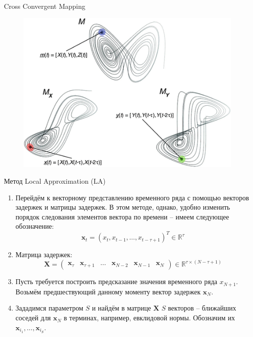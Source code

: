 \begin{frame}{Cross Convergent Mapping}
\begin{figure}
    \centering
    \includegraphics[width=\textwidth]{lecture_5/figs/CCM.png}
\end{figure}
\end{frame}
\begin{frame}{Метод Local Approximation (LA)}

\begin{enumerate}
    \item Перейдём к векторному представлению временного ряда с помощью векторов задержек и матрицы задержек. В этом методе, однако, удобно изменить порядок следования элементов вектора по времени -- имеем следующее обозначение:
    $$ \mathbf{x}_t = (x_t, x_{t-1}, \dots, x_{t - \tau + 1})^T \in \mathbb{R}^{\tau} $$
    \item Матрица задержек:
    $$\mathbf{X} = 
    \begin{pmatrix}
    \mathbf{x}_{\tau} & \mathbf{x}_{\tau + 1} & \dots & \mathbf{x}_{N-2} & \mathbf{x}_{N-1} & \mathbf{x}_N
    \end{pmatrix} \in \mathbb{R}^{\tau \times (N-\tau + 1)}$$
    
    \item Пусть требуется построить предсказание значения временного ряда $x_{N+1}$. Возьмём предшествующий данному моменту вектор задержек $\mathbf{x}_N$.
    \item Зададимся параметром $S$ и найдём в матрице $\mathbf{X}$ $S$ векторов -- ближайших соседей для $\mathbf{x}_N$ в терминах, например, евклидовой нормы. Обозначим их $\mathbf{x}_{i_1}, \dots, \mathbf{x}_{i_S}$.
    
\end{enumerate}

\end{frame}

